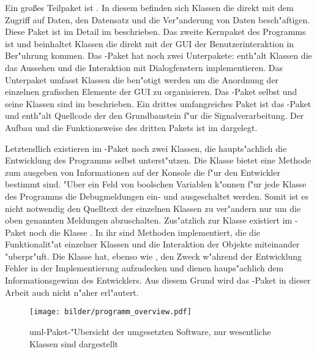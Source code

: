 Ein gro{\ss}es Teilpaket ist .
In diesem befinden sich Klassen die direkt mit dem Zugriff auf Daten, den Datensatz und die Ver"anderung von Daten besch"aftigen.
Diese Paket ist im Detail im  beschrieben.
Das zweite Kernpaket des Programms ist  und beinhaltet Klassen die direkt mit der \ac{GUI} der Benutzerinteraktion in Ber"uhrung kommen.
Das -Paket hat noch zwei Unterpakete:
 enth"alt Klassen die das Aussehen und die Interaktion mit Dialogfenstern implementieren.
Das Unterpaket  umfasst Klassen die ben"otigt werden um die Anordnung der einzelnen grafischen Elemente der \ac{GUI} zu organisieren.
Das -Paket selbst und seine Klassen sind im  beschrieben.
Ein drittes umfangreiches Paket ist das -Paket und enth"alt Quellcode der den Grundbaustein f"ur die Signalverarbeitung.
Der Aufbau und die Funktionsweise des dritten Pakets ist im  dargelegt.

Letztendlich existieren im -Paket noch zwei Klassen, die haupts"achlich die Entwicklung des Programms selbst unterst"utzen.
Die Klasse  bietet eine Methode zum ausgeben von Informationen auf der Konsole die f"ur den Entwickler bestimmt sind.
"Uber ein Feld von boolschen Variablen k"onnen f"ur jede Klasse des Programms die Debugmeldungen ein- und ausgeschaltet werden.
Somit ist es nicht notwendig den Quelltext der einzelnen Klassen zu ver"andern nur um die oben genannten Meldungen abzuschalten.
Zus"atzlich zur Klasse  existiert im -Paket noch die Klasse .
In ihr sind Methoden implementiert, die die Funktionalit"at einzelner Klassen und die Interaktion der Objekte miteinander "uberpr"uft.
Die  Klasse hat, ebenso wie , den Zweck w"ahrend der Entwicklung Fehler in der Implementierung aufzudecken und dienen haups"achlich dem Informationsgewinn des Entwicklers.
Aus diesem Grund wird das -Paket in dieser Arbeit auch nicht n"aher erl"autert.

\begin{figure}[htb]
\centering
\texttt{[image: bilder/programm\_overview.pdf]}
\caption[\acs{uml}-Paket-"Ubersicht der umgesetzten Software]{\ac{uml}-Paket-"Ubersicht der umgesetzten Software, nur wesentliche Klassen sind dargestellt}
\label{pic:paket_ubersicht}
\end{figure}

